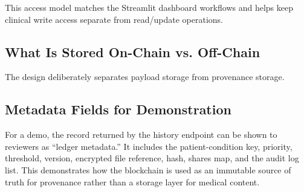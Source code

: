 \documentclass{IEEEtran}
\begin{document}
This access model matches the Streamlit dashboard workflows and helps keep clinical write access separate from read/update operations.

\subsection{What Is Stored On-Chain vs. Off-Chain}
The design deliberately separates payload storage from provenance storage.
\begin{table}[!t]
\caption{Storage Responsibility Split in the Proposed System}
\label{tab:split}
\centering
\footnotesize
\setlength{\tabcolsep}{3pt}
\end{table}

\subsection{Metadata Fields for Demonstration}
For a demo, the record returned by the history endpoint can be shown to reviewers as ``ledger metadata.'' It includes the patient-condition key, priority, threshold, version, encrypted file reference, hash, shares map, and the audit log list. This demonstrates how the blockchain is used as an immutable source of truth for provenance rather than a storage layer for medical content.
\end{document}
